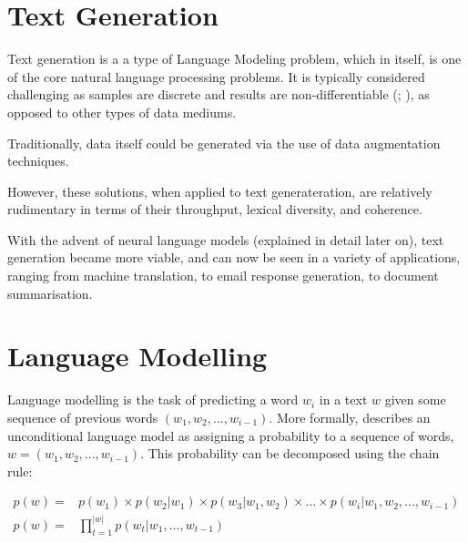 \documentclass[12pt,twoside]{report}
\begin{document}
\section{Text Generation}


Text generation is a a type of Language Modeling problem, which in itself, is one of the core natural language processing problems. It is typically considered challenging as samples are discrete and results are non-differentiable (\cite{kovalenko_controllable_2017}; \cite{kovalenko_controllable_2017-1}), as opposed to other types of data mediums. 

Traditionally, data itself could be generated via the use of data augmentation techniques.

However, these solutions, when applied to text generateration, are relatively rudimentary in terms of their throughput, lexical diversity, and coherence.

With the advent of neural language models (explained in detail later on), text generation became more viable, and can now be seen in a variety of applications, ranging from machine translation, to email response generation, to document summarisation.


\section{Language Modelling}

Language modelling is the task of predicting a word $w_i$ in a text $w$ given some sequence of previous words $(w_1, w_2, ..., w_{i-1})$. More formally, \cite{dyer_conditional_2017} describes an unconditional language model as assigning a probability to a sequence of words,  $w = (w_1, w_2, ..., w_{i-1})$. This probability can be decomposed using the chain rule:

\begin{align}
p(w) = &{} p(w_1) \times p(w_2|w_1) \times p(w_3|w_1, w_2) \times ... \times p(w_i|w_1, w_2, ..., w_{i-1}) \\
p(w) = &{} \prod^{|w|}_{t=1}p(w_t|w_1, ..., w_{t-1})
\end{align}
\end{document}
